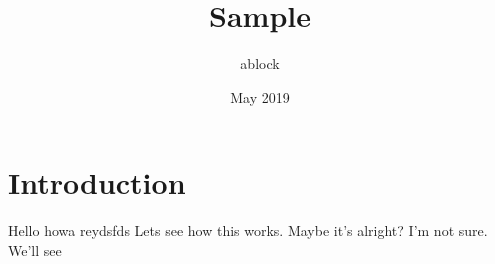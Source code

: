 \documentclass{article}
\title{Sample}
\author{ablock }
\date{May 2019}
\begin{document}
\maketitle

\section{Introduction}
Hello howa reydsfds Lets see how this works. Maybe it's alright? I'm not sure. We'll see



\end{document}
